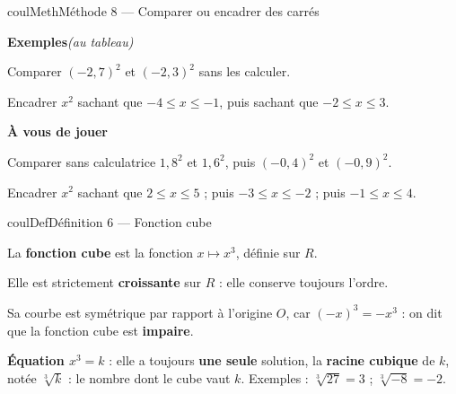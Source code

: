 \documentclass[11pt,a4paper]{article}
\makeatletter
\newcommand{\R}{\mathbb{R}}
\newcommand{\N}{\mathbb{N}}
\newcommand{\Z}{\mathbb{Z}}
\newcommand{\Q}{\mathbb{Q}}
\renewcommand{\le}{\leqslant}
\newcommand{\vect}[1]{\overrightarrow{#1}}
\newcommand{\fois}[1]{\times{\color{coulExo}#1}}
\newcommand{\lycee@repere}[4]{%
  \draw[grille,step=1] (#1,#2) grid (#3,#4);
  \draw[-{Stealth[length=2mm]},thick] (#1,0)--({#3+0.4},0) node[below left=-1pt]{$x$};
  \draw[-{Stealth[length=2mm]},thick] (0,#2)--(0,{#4+0.4}) node[below left=-1pt]{$y$};
  \node[below left,font=\scriptsize,inner sep=1.5pt] at (0,0) {$0$};}
\newcommand{\lycee@gradx}[1]{\foreach \k/\l in {#1}{%
  \draw (\k,0.07)--(\k,-0.07) node[below,font=\scriptsize,inner sep=1.5pt]{$\l$};}}
\newcommand{\lycee@grady}[1]{\foreach \k/\l in {#1}{%
  \draw (0.07,\k)--(-0.07,\k) node[left,font=\scriptsize,inner sep=1.5pt]{$\l$};}}
\providecommand{\repere}{\lycee@repere}%
\providecommand{\gradx}{\lycee@gradx}%
\providecommand{\grady}{\lycee@grady}%
\providecommand{\Cf}{\mathcal{C}\sb{f}}%
\providecommand{\Cg}{\mathcal{C}\sb{g}}%
\newcounter{lycee@signet}
\newcommand{\signet}[3][]{\stepcounter{lycee@signet}%
  \edef\lycee@dest{\if\relax\detokenize{#1}\relax
    signet.\arabic{lycee@signet}\else#1\fi}%
  \hypertarget{\lycee@dest}{}\bookmark[level=#2,dest=\lycee@dest]{#3}}
\def\R{R}\def\N{N}\def\Z{Z}\def\Q{Q}\def\vect#1{#1}\def\Cf{Cf}\def\Cg{Cg}\def\fois#1{×#1}%
\newcounter{methode}
\newenvironment{definitionbox}[1][Définition]%
  {\begin{boitecours}[phantom={\signet{2}{#1}}]{coulDef}{#1}}{\end{boitecours}}
\newenvironment{methodebox}[1][Méthode]{\stepcounter{methode}%
  \begin{boitecours}[phantom={\signet[methode-\arabic{methode}]{2}{#1}}]{coulMeth}{#1}}%
  {\end{boitecours}}
\newcommand{\etape}[1]{\par\smallskip\textbf{\color{coulMeth}#1}\par\nobreak\smallskip}
\newcommand{\autableau}{\hfill{\footnotesize\itshape\color{black!45}(au tableau)}}
\newcommand{\etapeexemples}{%
    \par\smallskip\textbf{\color{coulMeth}Exemples}\autableau\par\nobreak\smallskip}
\makeatother
\begin{document}
\begin{methodebox}[Méthode 8 --- Comparer ou encadrer des carrés]
\etapeexemples
\begin{questions}[label=\alph*)]
  \item Comparer $(-2{,}7)^{2}$ et $(-2{,}3)^{2}$ sans les calculer.
  \item Encadrer $x^{2}$ sachant que $-4\le x\le -1$, puis sachant que $-2\le x\le 3$.
\end{questions}

\etape{À vous de jouer}
\begin{questions}
  \item Comparer sans calculatrice $1{,}8^{2}$ et $1{,}6^{2}$, puis $(-0{,}4)^{2}$ et
        $(-0{,}9)^{2}$.
  \item Encadrer $x^{2}$ sachant que $2\le x\le 5$ ; puis $-3\le x\le -2$ ; puis
        $-1\le x\le 4$.
\end{questions}

\end{methodebox}

\begin{definitionbox}[Définition 6 --- Fonction cube]
\begin{minipage}[t]{0.58\linewidth}\raggedright
\vspace{0pt}
La \textbf{fonction cube} est la fonction $x\longmapsto x^{3}$, définie sur $\R$.

\smallskip
Elle est strictement \textbf{croissante} sur $\R$ : elle conserve toujours l'ordre.
\begin{center}
\end{center}
Sa courbe est symétrique par rapport à l'origine $O$, car $(-x)^{3}=-x^{3}$ : on dit
que la fonction cube est \textbf{impaire}.

\smallskip
\textbf{Équation $x^{3}=k$} : elle a toujours \textbf{une seule} solution, la
\textbf{racine cubique} de $k$, notée $\sqrt[3]{k}$ : le nombre dont le cube vaut $k$.
Exemples : $\sqrt[3]{27}=3$ ; $\sqrt[3]{-8}=-2$.
\end{minipage}\hfill
\begin{minipage}[t]{0.38\linewidth}\centering
\vspace{0pt}
\end{minipage}
\end{definitionbox}
\end{document}
